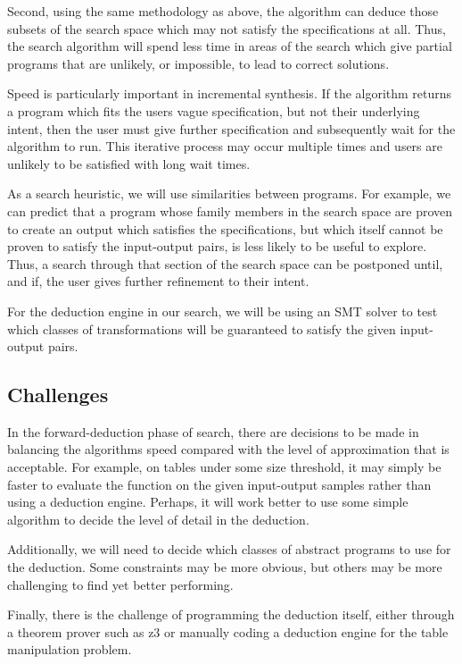 Second, using the same methodology as above, the algorithm can deduce those subsets of the search space which may not satisfy the specifications at all. Thus, the search algorithm will spend less time in areas of the search which give partial programs that are unlikely, or impossible, to lead to correct solutions.

Speed is particularly important in incremental synthesis. If the algorithm returns a program which fits the users vague specification, but not their underlying intent, then the user must give further specification and subsequently wait for the algorithm to run. This iterative process may occur multiple times and users are unlikely to be satisfied with long wait times.

As a search heuristic, we will use similarities between programs. For example, we can predict that a program whose family members in the search space are proven to create an output which satisfies the specifications, but which itself cannot be proven to satisfy the input-output pairs, is less likely to be useful to explore. Thus, a search through that section of the search space can be postponed until, and if, the user gives further refinement to their intent.

For the deduction engine in our search, we will be using an SMT solver to test which classes of transformations will be guaranteed to satisfy the given input-output pairs.

\subsection{Challenges}

In the forward-deduction phase of search, there are decisions to be made in balancing the algorithms speed compared with the level of approximation that is acceptable. For example, on tables under some size threshold, it may simply be faster to evaluate the function on the given input-output samples rather than using a deduction engine. Perhaps, it will work better to use some simple algorithm to decide the level of detail in the deduction.

Additionally, we will need to decide which classes of abstract programs to use for the deduction. Some constraints may be more obvious, but others may be more challenging to find yet better performing.

Finally, there is the challenge of programming the deduction itself, either through a theorem prover such as z3 or manually coding a deduction engine for the table manipulation problem.

